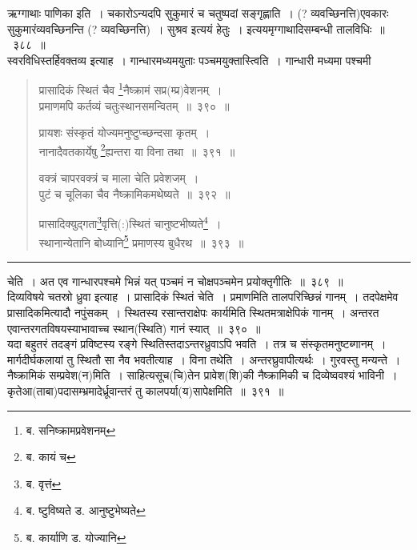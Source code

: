 \documentclass[11pt, openany]{book}
\begin{document}
ऋग्गाथाः पाणिका इति~। चकारोऽन्यदपि सुकुमारं च चतुष्पदां सङ्गृह्णाति~। (? व्यवच्छिनत्ति)एवकारः सुकुमारंव्यवच्छिनन्ति (? व्यवच्छिनत्ति)~। {\qtt सुश्रव इत्ययं} हेतुः~। इत्ययमृग्गाथादिसम्बन्धी तालविधिः~॥~३८८~॥\\

स्वरविधिस्तर्हिवक्तव्य इत्याह~। {\qtt गान्धारमध्यमयुताः} पञ्चमयुक्तास्त्विति~। गान्धारी मध्यमा पश्चमी 

\newpage

\begin{quote}
{\na प्रासादिकं स्थितं चैव \renewcommand{\thefootnote}{1}\footnote{ब. सनिष्क्रामप्रवेशनम्}नैष्क्रामं सप्र(म्प्र)वेशनम्~। \\
 प्रमाणमपि कर्तव्यं चतुःस्थानसमन्वितम्~॥~३९०~॥

 प्रायशः संस्कृतं योज्यमनुष्टुप्च्छन्दसा कृतम्~।\\
 नानादैवतकार्येषु \renewcommand{\thefootnote}{2}\footnote{ब. कायं च}ह्यन्तरा या विना तथा~॥~३९१~॥

 वक्त्रं चापरवक्त्रं च माला चेति प्रवेशजम्~।\\
 पुटं च चूलिका चैव नैष्क्रामिकमथेष्यते~॥~३९२~॥

 प्रासादिक्युद्गता\renewcommand{\thefootnote}{3}\footnote{ब. वृत्तं}वृत्ति(:)स्थितं चानुष्टभीष्यते\renewcommand{\thefootnote}{4}\footnote{ब. ष्टुविष्यते ड. आनुष्टुभेष्यते}~।\\
 स्थानान्येतानि बोध्यानि\renewcommand{\thefootnote}{5}\footnote{ब. कार्याणि ड. योज्यानि} प्रमाणस्य बुधैरथ~॥~३९३~॥}
\end{quote}

\hrule

\vspace{2mm}
\noindent
चेति~। अत एव गान्धारपश्चमे भिन्नं यत् पञ्चमं न चोक्षपञ्चमेन प्रयोक्तृगीतिः~॥~३८९~॥\\

दिव्यविषये चतस्रो ध्रुवा इत्याह~। {\qtt प्रासादिकं स्थितं} चेति~। प्रमाणमिति तालपरिच्छिन्नं गानम्~। तदपेक्षमेव प्रासादिकमित्यादौ नपुंसकम्~। स्थितस्य रसान्तराक्षेपः कार्यमिति स्थितमत्राक्षेपिकं गानम्~। अन्तरत एवान्तरगतविषयस्याभावाच्च स्थान(स्थिति) गानं स्यात्~॥~३९०~॥\\

यदा बहुतरं तदङ्गं प्रविष्टस्य रङ्गे स्थितिस्तदाऽन्तरध्रुवाऽपि भवति~। तत्र च {\qtt संस्कृतमनु}ष्टब्गानम्~। मार्गदीर्घकलायां तु स्थितौ सा नैव भवतीत्याह~। विना तथेति~। अन्तरघ्रुवापीत्यर्थः~। गुरवस्तु मन्यन्ते~। नैष्क्रामिकं सम्प्रवेश(न)मिति~। साहित्यसूच(चि)तेन प्रावेश(शि)की नैष्क्रामिकी च दिव्येष्ववश्यं भाविनी~। कृतेआ(ताबा)पदासम्भ्रमादेर्ध्रूवान्तरं तु कालपर्या(य)सापेक्षमिति~॥~३९१~॥\\
\end{document}
